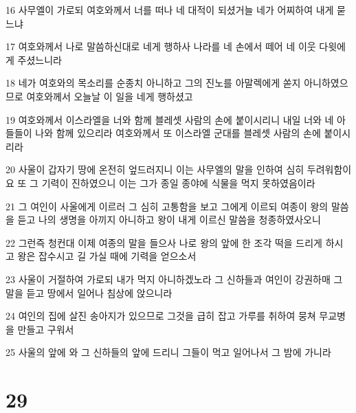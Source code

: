 \par 16 사무엘이 가로되 여호와께서 너를 떠나 네 대적이 되셨거늘 네가 어찌하여 내게 묻느냐
\par 17 여호와께서 나로 말씀하신대로 네게 행하사 나라를 네 손에서 떼어 네 이웃 다윗에게 주셨느니라
\par 18 네가 여호와의 목소리를 순종치 아니하고 그의 진노를 아말렉에게 쏟지 아니하였으므로 여호와께서 오늘날 이 일을 네게 행하셨고
\par 19 여호와께서 이스라엘을 너와 함께 블레셋 사람의 손에 붙이시리니 내일 너와 네 아들들이 나와 함께 있으리라 여호와께서 또 이스라엘 군대를 블레셋 사람의 손에 붙이시리라
\par 20 사울이 갑자기 땅에 온전히 엎드러지니 이는 사무엘의 말을 인하여 심히 두려워함이요 또 그 기력이 진하였으니 이는 그가 종일 종야에 식물을 먹지 못하였음이라
\par 21 그 여인이 사울에게 이르러 그 심히 고통함을 보고 그에게 이르되 여종이 왕의 말씀을 듣고 나의 생명을 아끼지 아니하고 왕이 내게 이르신 말씀을 청종하였사오니
\par 22 그런즉 청컨대 이제 여종의 말을 들으사 나로 왕의 앞에 한 조각 떡을 드리게 하시고 왕은 잡수시고 길 가실 때에 기력을 얻으소서
\par 23 사울이 거절하여 가로되 내가 먹지 아니하겠노라 그 신하들과 여인이 강권하매 그 말을 듣고 땅에서 일어나 침상에 앉으니라
\par 24 여인의 집에 살진 송아지가 있으므로 그것을 급히 잡고 가루를 취하여 뭉쳐 무교병을 만들고 구워서
\par 25 사울의 앞에 와 그 신하들의 앞에 드리니 그들이 먹고 일어나서 그 밤에 가니라

\chapter{29}


